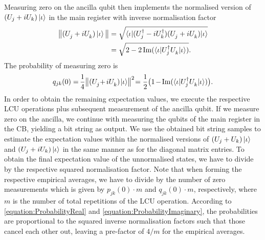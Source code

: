 \documentclass[10pt,conference]{IEEEtran}
\begin{document}
Measuring zero on the ancilla qubit then implements the normalised version of $(U_{j} + i U_{k}) \ket{\iota}$ in the main register with inverse normalisation factor
\begin{align}\label{equation:NormalisationImaginary}
    \begin{split}
        \big\lVert(U_{j}^{\vphantom{\dagger}} + i U_{k}^{\vphantom{\dagger}}) \ket{\iota}\big\rVert &= \sqrt{\braket{\iota | (U_{j}^{\dagger} - i U_{k}^{\dagger}) (U_{j}^{\vphantom{\dagger}} + i U_{k}^{\vphantom{\dagger}}) | \iota}} \\
        &= \sqrt{2 - 2 \Im(\braket{\iota | U_{j}^{\dagger} U_{k}^{\vphantom{\dagger}} | \iota})}.
    \end{split}
\end{align}
The probability of measuring zero is
\begin{align}\label{equation:ProbabilityImaginary}
    q_{j k}(0) =\hspace*{-1pt} \frac{1}{4} \big\lVert(U_{j}^{\vphantom{\dagger}}\hspace*{-2pt} +\hspace*{-1pt} i U_{k}^{\vphantom{\dagger}})\hspace*{-1pt} \ket{\iota}\hspace*{-2pt}\big\rVert^{2}\hspace*{-2pt} = \frac{1}{2} \big(1\hspace*{-1pt} -\hspace*{-1pt} \Im(\braket{\iota | U_{j}^{\dagger} U_{k}^{\vphantom{\dagger}} | \iota})\big).
\end{align}
In order to obtain the remaining expectation values, we execute the respective LCU operations plus subsequent measurement of the ancilla qubit.
If we measure zero on the ancilla, we continue with measuring the qubits of the main register in the CB, yielding a bit string as output.
We use the obtained bit string samples to estimate the expectation values within the normalised versions of $(U_{j} + U_{k}) \ket{\iota}$ and $(U_{j} + i U_{k}) \ket{\iota}$ in the same manner as for the diagonal matrix entries.
To obtain the final expectation value of the unnormalised states, we have to divide by the respective squared normalisation factor.
Note that when forming the respective empirical averages, we have to divide by the number of zero measurements which is given by $p_{j k}(0) \cdot m$ and $q_{j k}(0) \cdot m$, respectively, where $m$ is the number of total repetitions of the LCU operation.
According to \eqref{equation:ProbabilityReal} and \eqref{equation:ProbabilityImaginary}, the probabilities are proportional to the squared inverse normalisation factors such that those cancel each other out, leaving a pre-factor of $4 / m$ for the empirical averages.
\end{document}

